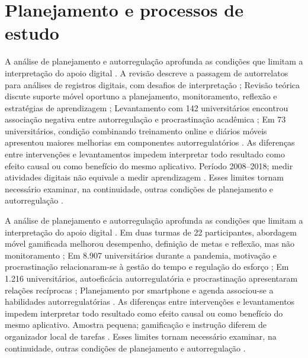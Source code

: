 \clearpage\section{Planejamento e processos de estudo}

A análise de planejamento e autorregulação aprofunda as condições que limitam a interpretação do apoio digital \citep[p. 4, 15–16]{education_araka2020} \citep{education_baars2022} \citep{education_brahma2023} \citep{education_broadbent2020}. A revisão descreve a passagem de autorrelatos para análises de registros digitais, com desafios de interpretação \citep[p. 4, 15–16]{education_araka2020}; Revisão teórica discute suporte móvel oportuno a planejamento, monitoramento, reflexão e estratégias de aprendizagem \citep{education_baars2022}; Levantamento com 142 universitários encontrou associação negativa entre autorregulação e procrastinação acadêmica \citep{education_brahma2023}; Em 73 universitários, condição combinando treinamento online e diários móveis apresentou maiores melhorias em componentes autorregulatórios \citep{education_broadbent2020}. As diferenças entre intervenções e levantamentos impedem interpretar todo resultado como efeito causal ou como benefício do mesmo aplicativo. Período 2008–2018; medir atividades digitais não equivale a medir aprendizagem \citep[p. 4, 15–16]{education_araka2020} \citep{education_baars2022} \citep{education_brahma2023} \citep{education_broadbent2020}. Esses limites tornam necessário examinar, na continuidade, outras condições de planejamento e autorregulação \citep[p. 4, 15–16]{education_araka2020} \citep{education_baars2022} \citep{education_brahma2023} \citep{education_broadbent2020}.

A análise de planejamento e autorregulação aprofunda as condições que limitam a interpretação do apoio digital \citep{education_chen2024} \citep{education_forstervold2022} \citep{education_han2023} \citep{education_hartley2022}. Em duas turmas de 22 participantes, abordagem móvel gamificada melhorou desempenho, definição de metas e reflexão, mas não monitoramento \citep{education_chen2024}; Em 8.907 universitários durante a pandemia, motivação e procrastinação relacionaram-se à gestão do tempo e regulação do esforço \citep{education_forstervold2022}; Em 1.216 universitários, autoeficácia autorregulatória e procrastinação apresentaram relações recíprocas \citep{education_han2023}; Planejamento por smartphone e agenda associou-se a habilidades autorregulatórias \citep{education_hartley2022}. As diferenças entre intervenções e levantamentos impedem interpretar todo resultado como efeito causal ou como benefício do mesmo aplicativo. Amostra pequena; gamificação e instrução diferem de organizador local de tarefas \citep{education_chen2024} \citep{education_forstervold2022} \citep{education_han2023} \citep{education_hartley2022}. Esses limites tornam necessário examinar, na continuidade, outras condições de planejamento e autorregulação \citep{education_chen2024} \citep{education_forstervold2022} \citep{education_han2023} \citep{education_hartley2022}.

